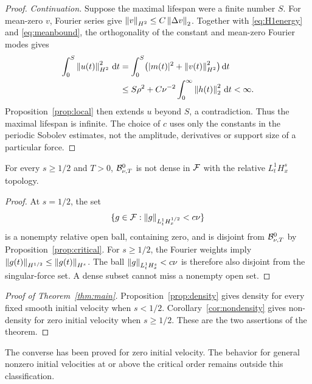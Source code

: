 \begin{proof}
\emph{Continuation.}
Suppose the maximal lifespan were a finite number $S$.
For mean-zero $v$, Fourier series give
$\left\lVert v\right\rVert_{H^2}\le C\left\lVert\Delta v\right\rVert_2$.
Together with \eqref{eq:H1energy} and \eqref{eq:meanbound}, the
orthogonality of the constant and mean-zero Fourier modes gives
\begin{align*}
 \int_0^S\left\lVert u(t)\right\rVert_{H^2}^2\,\mathrm d t
 &=\int_0^S\bigl(|m(t)|^2+\left\lVert v(t)\right\rVert_{H^2}^2\bigr)\,\mathrm d t\\
 &\le S\rho^2+C\nu^{-2}
             \int_0^\infty\left\lVert h(t)\right\rVert_2^2\,\mathrm d t<\infty.
\end{align*}
Proposition~\ref{prop:local} then extends $u$ beyond $S$, a contradiction.
Thus the maximal lifespan is infinite. The choice of $c$ uses only the constants in the periodic Sobolev estimates, not the amplitude, derivatives or support size of a particular force.
\end{proof}

\begin{corollary}\label{cor:nondensity}
For every $s\ge1/2$ and $T>0$, $\mathcal B^0_{\nu,T}$ is not dense in
$\mathcal F$ with the relative $L^1_tH^s_x$ topology.
\end{corollary}
\begin{proof}
At $s=1/2$, the set
\[
 \{g\in\mathcal F:\left\lVert g\right\rVert_{L^1_tH^{1/2}_x}<c\nu\}
\]
is a nonempty relative open ball, containing zero, and is disjoint from
$\mathcal B^0_{\nu,T}$ by Proposition~\ref{prop:critical}.
For $s\ge1/2$, the Fourier weights imply
$\left\lVert g(t)\right\rVert_{H^{1/2}}\le\left\lVert g(t)\right\rVert_{H^s}$.
The ball $\left\lVert g\right\rVert_{L^1_tH^s_x}<c\nu$ is therefore also disjoint from the singular-force set. A dense subset cannot miss a nonempty open set.
\end{proof}

\begin{proof}[Proof of Theorem~\ref{thm:main}]
Proposition~\ref{prop:density} gives density for every fixed smooth initial velocity when $s<1/2$. Corollary~\ref{cor:nondensity} gives non-density for zero initial velocity when $s\ge1/2$. These are the two assertions of the theorem.
\end{proof}
The converse has been proved for zero initial velocity. The behavior for general nonzero initial velocities at or above the critical order remains outside this classification.

